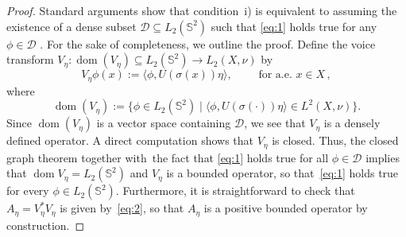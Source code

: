 \documentclass[a4paper,11pt,DIV=11,%
abstract=on%
]{scrartcl}
\DeclareMathOperator{\dom}{dom}
\newcommand{\red}[1]{#1}
\begin{document}
\begin{proof}
	Standard arguments show that condition~i) is equivalent to assuming the existence of a dense
	subset $\mathcal D\subseteq L_2(\mathbb S^2)$ such that \eqref{eq:1} holds
	true for any $\phi\in \mathcal D$ \cite{fuhr2005abstract}.
	For the  sake of completeness, we outline
	the proof. Define the voice transform 
	$V_\eta: \operatorname{dom} (V_\eta) \subseteq L_2(\mathbb S^2) \to L_2(X,\nu)$ by
	\[
	V_\eta \phi(x) := \langle\phi,U(\sigma(x))\eta \rangle,
	\qquad\text{ for a.e. }x\in X\,,
	\]
	where
	\[\dom(V_\eta)
	:=\{ \phi \in L_2(\mathbb S^2)\mid \langle\phi,U(\sigma(\cdot))\eta \rangle\in L^2(X,\nu)\}.
	\]
	Since $\dom(V_\eta)$ is a vector space containing $\mathcal D$, we see that $V_\eta$ is a
	densely defined operator. A direct computation shows that $V_\eta$ is closed. Thus, the closed
	graph theorem \red{together with~the fact that \eqref{eq:1} holds true for all
          $\phi\in\mathcal D$} implies that $\dom V_\eta = L_2(\mathbb S^2)$ and $V_\eta$ is a bounded operator,
	so that~\eqref{eq:1} holds true for every 	$\phi\in L_2(\mathbb S^2)$.  
	Furthermore, it is straightforward to
	check that $A_\eta=V_\eta^*V_\eta$ is given by~\eqref{eq:2}, so that $A_\eta$ is
	a positive bounded operator by construction. 
	

\end{proof}
\end{document}
